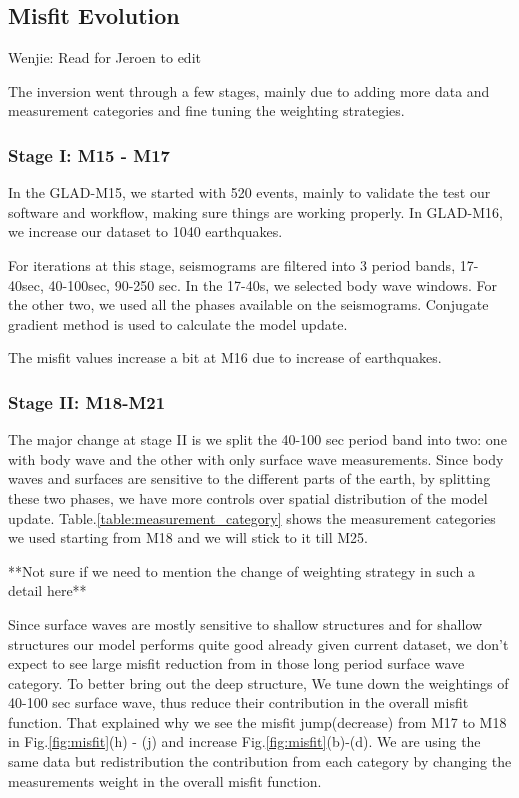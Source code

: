 \documentclass[extra,mreferee]{gji}
\begin{document}
\subsection{Misfit Evolution}

{\color{Red} Wenjie: Read for Jeroen to edit}

The inversion went through a few stages, mainly due to adding more data
and measurement categories and fine tuning the weighting strategies.

\subsubsection{Stage I: M15 - M17}

In the GLAD-M15, we started with 520 events, mainly to validate the test our
software and workflow, making sure things are working properly.
In GLAD-M16, we increase our dataset to 1040 earthquakes.

For iterations at this stage, seismograms are filtered into 3 period bands,
17-40sec, 40-100sec, 90-250 sec. In the 17-40s, we selected body wave windows. For the
other two, we used all the phases available on the seismograms. Conjugate
gradient method is used to calculate the model update.

The misfit values increase a bit at M16 due to increase of earthquakes.

\subsubsection{Stage II: M18-M21}

The major change at stage II is we split the 40-100 sec period band into two: one with
body wave and the other with only surface wave measurements. Since body waves and
surfaces are sensitive to the different parts of the earth, by splitting these two
phases, we have more controls over spatial distribution of the model update.
Table.\ref{table:measurement_category} shows the measurement categories we used starting
from M18 and we will stick to it till M25.

**Not sure if we need to mention the change of weighting strategy in such a detail here**

Since surface waves are mostly sensitive to shallow
structures and for shallow structures our model performs quite good
already given current dataset, we don't expect to see large misfit
reduction from in those long period surface wave category.
To better bring out the deep structure, We tune
down the weightings of 40-100 sec surface wave, thus reduce their
contribution in the overall misfit function. That explained why we see the
misfit jump(decrease) from M17 to M18 in Fig.\ref{fig:misfit}(h) - (j) and
increase Fig.\ref{fig:misfit}(b)-(d). We are using the same data but
redistribution the contribution from each category by changing the measurements
weight in the overall misfit function.
\end{document}
